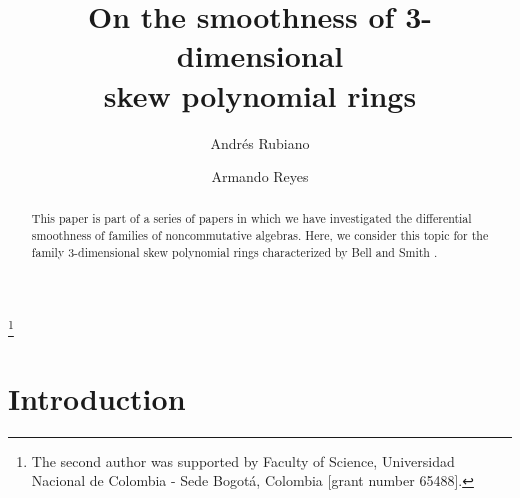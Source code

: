 \documentclass{amsart}
\theoremstyle{definition}
\theoremstyle{remark}
\numberwithin{equation}{section}
\begin{document}
\title[On the smoothness of 3-dimensional skew polynomial rings]{On the smoothness of 3-dimensional \\ skew polynomial rings}

\author{Andr\'es Rubiano}
\address{Universidad Distrital Francisco Jos\'e de Caldas}

\author{Armando Reyes}
\address{Universidad Nacional de Colombia - Sede Bogot\'a}

\thanks{The second author was supported by Faculty of Science, Universidad Nacional de Colombia - Sede Bogot\'a, Colombia [grant number 65488].}



\date{}


\begin{abstract} 

This paper is part of a series of papers in which we have investigated the differential smoothness of families of noncommutative algebras. Here, we consider this topic for the family 3-dimensional skew polynomial rings characterized by Bell and Smith \cite{BellSmith1990}.

\end{abstract}

\maketitle


\section{Introduction}
\end{document}

